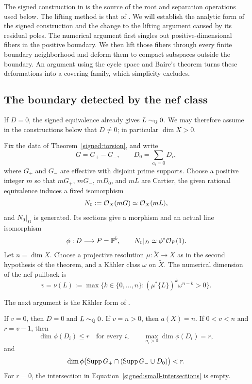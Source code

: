 The signed construction in \cite[Proposition~3.3]{LI} is the source
of the root and separation operations used below.  The lifting
method is that of \cite[Sections~10--12]{BL}.
We will establish the analytic form of the signed construction and
the change to the lifting argument caused by its residual poles.
The numerical argument first singles out positive-dimensional fibers in
the positive boundary.  We then lift those fibers through every finite
boundary neighborhood and deform them to compact subspaces outside the
boundary. An argument using the cycle space and Baire's theorem turns these
deformations into a covering family, which simplicity excludes.

\subsection{The boundary detected by the nef class}

If \(D=0\), the signed equivalence already gives
\(L\sim_{\mathbb Q}0\).  We may therefore assume in the constructions
below that \(D\ne0\); in particular \(\dim X>0\).

Fix the data of Theorem~\ref{signed:torsion}, and write
\[
 G=G_+-G_-,\qquad D_0=\sum_{a_i=0}D_i,
\]
where \(G_+\) and \(G_-\) are effective with disjoint prime supports.
Choose a positive integer \(m\) so that \(mG_+\), \(mG_-\),
\(mD_0\), and \(mL\) are Cartier, the given rational equivalence
induces a fixed isomorphism
\[
 N_0:=\mathcal O_X(mG)\simeq\mathcal O_X(mL),
\]
and \(N_0|_D\) is generated.  Its sections give a morphism and an
actual line isomorphism
\begin{equation}\label{signed:boundary-map}
 \phi:D\longrightarrow P=\mathbb P^b,\qquad
 N_0|_D\simeq\phi^*\mathcal O_P(1).
\end{equation}
Let \(n=\dim X\).  Choose a projective resolution
\(\mu:\widetilde X\to X\) as in the second hypothesis of the theorem,
and a Kähler class \(\omega\) on \(\widetilde X\).  The numerical
dimension of the nef pullback is
\[
 v=\nu(L):=\max\bigl\{k\in\{0,\ldots,n\}:
       (\mu^*\{L\})^k\omega^{n-k}>0\bigr\}.
\]

The next argument is the Kähler form of
\cite[Lemma~3.2]{LI}.

\begin{lemma}\label{signed:boundary-geometry}
If \(v=0\), then \(D=0\) and \(L\sim_{\mathbb Q}0\).  If \(v=n>0\),
then \(a(X)=n\).  If \(0<v<n\) and \(r=v-1\), then
\[
 \dim\phi(D_i)\leq r\quad\text{for every }i,
 \qquad
 \max_{a_i>0}\dim\phi(D_i)=r,
\]
and
\begin{equation}\label{signed:small-intersections}
 \dim\phi\bigl(\operatorname{Supp} G_+\cap(\operatorname{Supp} G_-\cup D_0)\bigr)<r.
\end{equation}
For \(r=0\), the intersection in
Equation~\eqref{signed:small-intersections} is empty.
\end{lemma}

